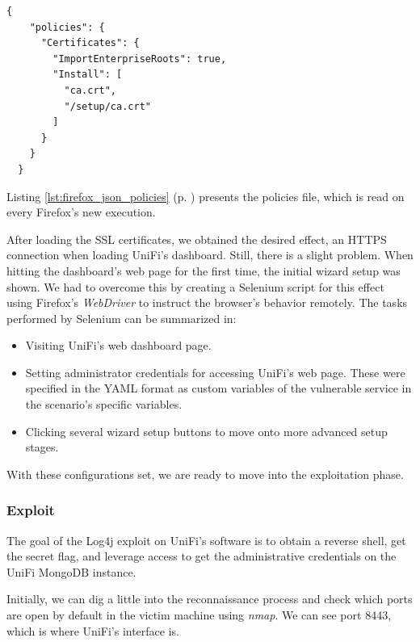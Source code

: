 \begin{lstlisting}[caption=Firefox's Policies File.,numbers=none,label={lst:firefox_json_policies}]
{
    "policies": {
      "Certificates": {
        "ImportEnterpriseRoots": true,
        "Install": [
          "ca.crt",
          "/setup/ca.crt"
        ]
      }
    }
  }
\end{lstlisting}

Listing \ref{lst:firefox_json_policies} (p. \pageref{lst:firefox_json_policies}) presents the policies file, which is read on every Firefox's new execution.


After loading the SSL certificates, we obtained the desired effect, an HTTPS connection when loading UniFi's dashboard. Still, there is a slight problem. When hitting the dashboard's web page for the first time, the initial wizard setup was shown. We had to overcome this by creating a Selenium script for this effect using Firefox's \textit{WebDriver} to instruct the browser's behavior remotely. The tasks performed by Selenium can be summarized in:

\begin{itemize}
    \item Visiting UniFi's web dashboard page.
    \item Setting administrator credentials for accessing UniFi's web page. These were specified in the YAML format as custom variables of the vulnerable service in the scenario's specific variables.
    \item Clicking several wizard setup buttons to move onto more advanced setup stages.
\end{itemize}

With these configurations set, we are ready to move into the exploitation phase.

\subsubsection{Exploit} \label{sec:validation_log4j_exploit}

The goal of the Log4j exploit on UniFi's software is to obtain a reverse shell, get the secret flag, and leverage access to get the administrative credentials on the UniFi MongoDB instance.

Initially, we can dig a little into the reconnaissance process and check which ports are open by default in the victim machine using \textit{nmap}. We can see port 8443, which is where UniFi's interface is.

